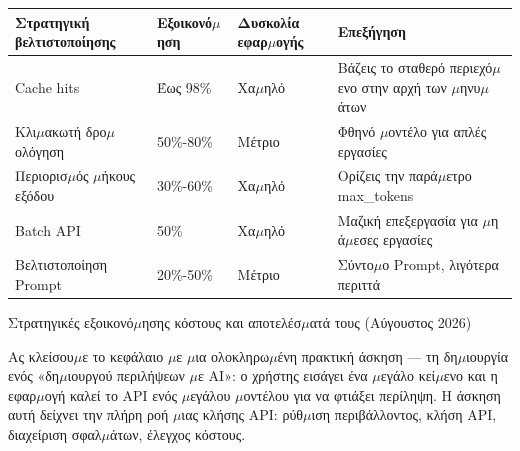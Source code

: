 \begin{center}
\begin{tabularx}{\linewidth}{|X|X|X|X|}
\hline
\textbf{Στρατηγική βελτιστοποίησης} & \textbf{Εξοικονό$\mu$ηση} & \textbf{Δυσκολία εφαρ$\mu$ογής} & \textbf{Επεξήγηση} \tabularnewline
\hline
Cache hits & Έως 98\% & Χα$\mu$ηλό & Βάζεις το σταθερό περιεχό$\mu$ενο στην αρχή των $\mu$ηνυ$\mu$άτων \tabularnewline
Κλι$\mu$ακωτή δρο$\mu$ολόγηση & 50\%-80\% & Μέτριο & Φθηνό $\mu$οντέλο για απλές εργασίες \tabularnewline
Περιορισ$\mu$ός $\mu$ήκους εξόδου & 30\%-60\% & Χα$\mu$ηλό & Ορίζεις την παρά$\mu$ετρο max\_tokens \tabularnewline
Batch API & 50\% & Χα$\mu$ηλό & Μαζική επεξεργασία για $\mu$η ά$\mu$εσες εργασίες \tabularnewline
Βελτιστοποίηση Prompt & 20\%-50\% & Μέτριο & Σύντο$\mu$ο Prompt, λιγότερα περιττά \tabularnewline
\hline
\end{tabularx}
\end{center}

\begin{center}\small\color{gray}Στρατηγικές εξοικονό$\mu$ησης κόστους και αποτελέσ$\mu$ατά τους (Αύγουστος 2026)\end{center}


Ας κλείσου$\mu$ε το κεφάλαιο $\mu$ε $\mu$ια ολοκληρω$\mu$ένη πρακτική άσκηση — τη δη$\mu$ιουργία ενός «δη$\mu$ιουργού περιλήψεων $\mu$ε AI»: ο χρήστης εισάγει ένα $\mu$εγάλο κεί$\mu$ενο και η εφαρ$\mu$ογή καλεί το API ενός $\mu$εγάλου $\mu$οντέλου για να φτιάξει περίληψη. Η άσκηση αυτή δείχνει την πλήρη ροή $\mu$ιας κλήσης API: ρύθ$\mu$ιση περιβάλλοντος, κλήση API, διαχείριση σφαλ$\mu$άτων, έλεγχος κόστους.

